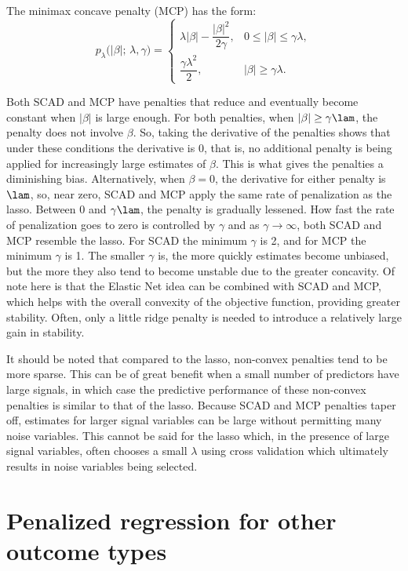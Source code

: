 \noindent The minimax concave penalty (MCP) has the form:
$$
\displaystyle
p_\lambda\!\bigl(|\beta|;\,\lambda,\gamma\bigr)=
\begin{cases}
\lambda|\beta| - \dfrac{|\beta|^{2}}{2\gamma}, &
0 \le |\beta| \le \gamma\lambda, \\[6pt]
\dfrac{\gamma\lambda^{2}}{2}, &
|\beta| \ge \gamma\lambda.
\end{cases}
$$

Both SCAD and MCP have penalties that reduce and eventually become constant when $|\beta|$ is large enough. For both penalties, when $|\beta| \geq \gamma \lam$, the penalty does not involve $\beta$. So, taking the derivative of the penalties shows that under these conditions the derivative is $0$, that is, no additional penalty is being applied for increasingly large estimates of $\beta$. This is what gives the penalties a diminishing bias. Alternatively, when $\beta = 0$, the derivative for either penalty is $\lam$, so, near zero, SCAD and MCP apply the same rate of penalization as the lasso. Between $0$ and $\gamma \lam$, the penalty is gradually lessened. How fast the rate of penalization goes to zero is controlled by $\gamma$ and as $\gamma \rightarrow \infty$, both SCAD and MCP resemble the lasso. For SCAD the minimum $\gamma$ is 2, and for MCP the minimum $\gamma$ is 1. The smaller $\gamma$ is, the more quickly estimates become unbiased, but the more they also tend to become unstable due to the greater concavity. Of note here is that the Elastic Net idea can be combined with SCAD and MCP, which helps with the overall convexity of the objective function, providing greater stability. Often, only a little ridge penalty is needed to introduce a relatively large gain in stability. 

It should be noted that compared to the lasso, non-convex penalties tend to be more sparse. This can be of great benefit when a small number of predictors have large signals, in which case the predictive performance of these non-convex penalties is similar to that of the lasso. Because SCAD and MCP penalties taper off, estimates for larger signal variables can be large without permitting many noise variables. This cannot be said for the lasso which, in the presence of large signal variables, often chooses a small $\lambda$ using cross validation which ultimately results in noise variables being selected.

\section{Penalized regression for other outcome types}


